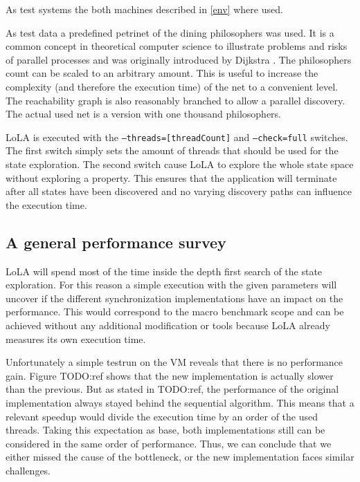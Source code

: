 As test systems the both machines described in \ref{env} where used.

As test data a predefined petrinet of the dining philosophers was used. It is a common concept in theoretical computer science to illustrate problems and risks of parallel processes and was originally introduced by Dijkstra \cite{dijkstra1971hierarchical}. The philosophers count can be scaled to an arbitrary amount. This is useful to increase the complexity (and therefore the execution time) of the net to a convenient level. The reachability graph is also reasonably branched to allow a parallel discovery. The actual used net is a version with one thousand philosophers.

LoLA is executed with the \texttt{--threads=[threadCount]} and \texttt{--check=full} switches. The first switch simply sets the amount of threads that should be used for the state exploration. The second switch cause LoLA to explore the whole state space without exploring a property. This ensures that the application will terminate after all states have been discovered and no varying discovery paths can influence the execution time.

\subsection{A general performance survey}
LoLA will spend most of the time inside the depth first search of the state exploration. For this reason a simple execution with the given parameters will uncover if the different synchronization implementations have an impact on the performance. This would correspond to the macro benchmark scope and can be achieved without any additional modification or tools because LoLA already measures its own execution time.

Unfortunately a simple testrun on the VM reveals that there is no performance gain. Figure TODO:ref shows that the new implementation is actually slower than the previous. But as stated in TODO:ref, the performance of the original implementation always stayed behind the sequential algorithm. This means that a relevant speedup would divide the execution time by an order of the used threads. Taking this expectation as base, both implementations still can be considered in the same order of performance. Thus, we can conclude that we either missed the cause of the bottleneck, or the new implementation faces similar challenges.



